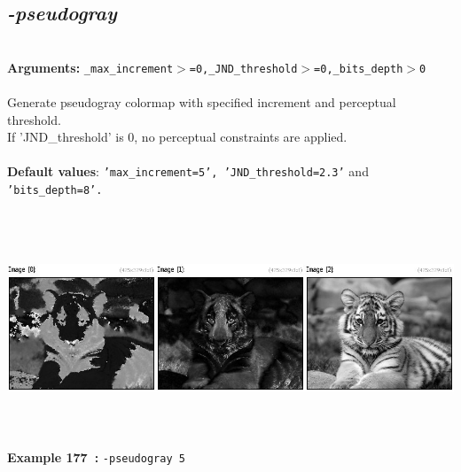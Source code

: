 \documentclass[a4paper,11pt,twoside]{book}
\begin{document}
\subsection{\emph{-pseudogray} }\vspace*{-0.5em}
~\\\textbf{Arguments: } 
{\small \texttt{\_max\_increment$>$=0,\_JND\_threshold$>$=0,\_bits\_depth$>$0}}\\~\\
Generate pseudogray colormap with specified increment and perceptual threshold.
~\\If 'JND\_threshold' is 0, no perceptual constraints are applied.
~\\~\\\textbf{Default values}: {\small \texttt{'max\_increment=5', 'JND\_threshold=2.3'} and \texttt{'bits\_depth=8'.}}
\begin{center}\includegraphics[keepaspectratio=true,height=7cm,width=\textwidth]{img/gmic_def177.jpg}\\
{\footnotesize \textbf{Example 177~:} \texttt{-pseudogray 5}}
\end{center}
\end{document}
